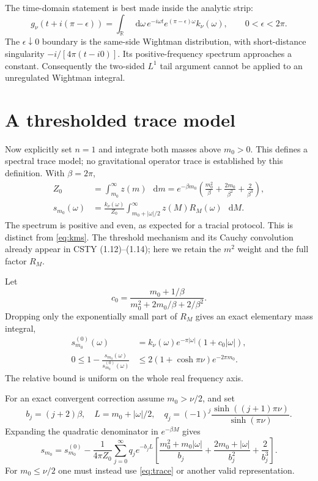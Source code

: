 \documentclass[11pt,a4paper]{article}
\newcommand{\dd}{\mathop{}\!\mathrm d}
\begin{document}
The time-domain statement is best made inside the analytic strip:
\begin{equation}
g_\nu(t+i(\pi-\epsilon))
=\int_{\mathbb R}\dd\omega\,
e^{-i\omega t}e^{(\pi-\epsilon)\omega}k_\nu(\omega),
\qquad0<\epsilon<2\pi .
\end{equation}
The \(\epsilon\downarrow0\) boundary is the same-side Wightman
distribution, with short-distance singularity
\(-i/[4\pi(t-i0)]\).
Its positive-frequency spectrum approaches a constant.
Consequently the two-sided \(L^1\) tail argument cannot be applied
to an unregulated Wightman integral.

\section{A thresholded trace model}
Now explicitly set \(n=1\) and integrate both masses above \(m_0>0\).
This defines a spectral trace model; no gravitational operator
trace is established by this definition.
With \(\beta=2\pi\),
\begin{align}
Z_0&=\int_{m_0}^\infty z(m)\,\dd m
=e^{-\beta m_0}\left(\frac{m_0^2}{\beta}
+\frac{2m_0}{\beta^2}+\frac2{\beta^3}\right),\\
s_{m_0}(\omega)&=
\frac{k_\nu(\omega)}{Z_0}
\int_{m_0+|\omega|/2}^\infty
z(M)R_M(\omega)\,\dd M .\label{eq:trace}
\end{align}
The spectrum is positive and even, as expected for a tracial
protocol. This is distinct from \eqref{eq:kms}.
The threshold mechanism and its Cauchy convolution already
appear in CSTY (1.12)--(1.14); here we retain the \(m^2\) weight
and the full factor \(R_M\).

Let
\begin{equation}
c_0=\frac{m_0+1/\beta}{m_0^2+2m_0/\beta+2/\beta^2}.
\end{equation}
Dropping only the exponentially small part of \(R_M\) gives an
exact elementary mass integral,
\begin{align}
s^{(0)}_{m_0}(\omega)&=
k_\nu(\omega)e^{-\pi|\omega|}(1+c_0|\omega|),\\
0\le1-\frac{s_{m_0}(\omega)}{s^{(0)}_{m_0}(\omega)}
&\le2(1+\cosh\pi\nu)e^{-2\pi m_0}.\label{eq:tracebound}
\end{align}
The relative bound is uniform on the whole real frequency axis.

For an exact convergent correction assume \(m_0>\nu/2\), and set
\[
b_j=(j+2)\beta,\quad L=m_0+|\omega|/2,\quad
q_j=(-1)^j\frac{\sinh((j+1)\pi\nu)}{\sinh(\pi\nu)}.
\]
Expanding the quadratic denominator in \(e^{-\beta M}\) gives
\begin{equation}
s_{m_0}=s^{(0)}_{m_0}
-\frac1{4\pi Z_0}\sum_{j=0}^\infty q_j e^{-b_jL}
\left[\frac{m_0^2+m_0|\omega|}{b_j}
+\frac{2m_0+|\omega|}{b_j^2}+\frac2{b_j^3}\right].
\label{eq:series}
\end{equation}
For \(m_0\le\nu/2\) one must instead use \eqref{eq:trace}
or another valid representation.
\end{document}
